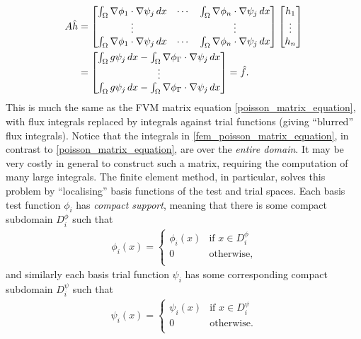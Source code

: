 \renewcommand{\integralentry}[2]{\int_{\om}\nabla\phi_{#2}\cdot\nabla{\psi_j}\,dx}
\renewcommand{\integralrhsentry}[1]{\int_{\om}g\psi_j\,dx - \int_{\om}\nabla\phi_\Gamma\cdot\nabla{\psi_j}\,dx}
\begin{equation}\label{fem_poisson_matrix_equation}
\begin{split}
    A\hat{h}
    &= \begin{bmatrix}
            \integralentry{1}{1} & \cdots & \integralentry{1}{n} \\
            \vdots & & \vdots \\
            \integralentry{n}{1} & \cdots & \integralentry{n}{n}
    \end{bmatrix}
    \begin{bmatrix} h_1 \\ \vdots \\ h_n \end{bmatrix}
    \\
    &= \begin{bmatrix} \integralrhsentry{1} \\ \vdots \\ \integralrhsentry{n}  \end{bmatrix}
    = \hat{f}.
\end{split}
\end{equation}
This is much the same as the FVM matrix equation \eqref{poisson_matrix_equation}, with flux integrals replaced
by integrals against trial functions (giving ``blurred'' flux integrals).
Notice that the integrals in \eqref{fem_poisson_matrix_equation}, in contrast to \eqref{poisson_matrix_equation},
are over the \textit{entire domain}. It may be very costly in general to construct such a matrix, requiring
the computation of many large integrals. The finite element method, in particular, solves this problem
by ``localising'' basis functions of the test and trial spaces. Each basis test function $\phi_i$
has \textit{compact support}, meaning that there is some compact subdomain $D^\phi_i$ such that
\begin{align*}
    \phi_i(x) =
    \left\{\begin{array}{lr}
        \phi_i(x) &\text{if $x \in D^\phi_i$}\\
        0 &\text{otherwise},\\
    \end{array}\right.
\end{align*}
and similarly each basis trial function $\psi_i$ has some corresponding compact subdomain $D^\psi_i$ such that
\begin{align*}
    \psi_i(x) =
    \left\{\begin{array}{lr}
        \psi_i(x) &\text{if $x \in D^\psi_i$}\\
        0 &\text{otherwise}.\\
    \end{array}\right.
\end{align*}
